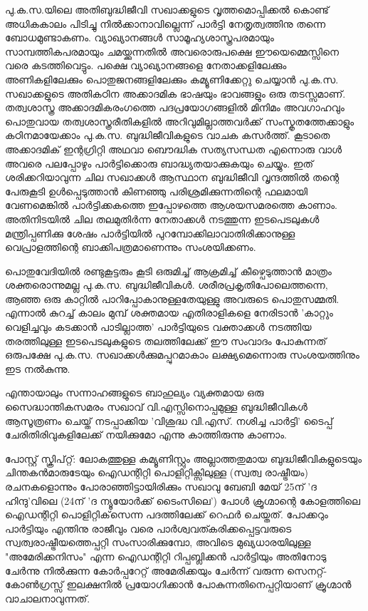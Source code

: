 പു.ക.സ.യിലെ അതിബുദ്ധിജീവി സഖാക്കളുടെ വൃത്തമൊപ്പിക്കല്‍ കൊണ്ട് അധികകാലം പിടിച്ചു നില്‍ക്കാനാവില്ലെന്ന് 
പാര്‍ട്ടി നേതൃത്വത്തിനു തന്നെ ബോധമുണ്ടാകണം. വ്യാഖ്യാനങ്ങള്‍ സാമൂഹ്യശാസ്ത്രപരമായും സാമ്പത്തികപരമായും 
ചമയ്ക്കുന്നതില്‍ അവരൊരുപക്ഷെ ഈയെമ്മെസ്സിനെ വരെ കടത്തിവെട്ടും. പക്ഷെ വ്യാഖ്യാനങ്ങളെ നേതാക്കളിലേക്കും 
അണികളിലേക്കും പൊതുജനങ്ങളിലേക്കും കമ്യൂണിക്കേറ്റു ചെയ്യാന്‍ പു.ക.സ. സഖാക്കളുടെ അതികഠിന അക്കാദമിക ഭാഷയും
ഭാവങ്ങളും ഒരു തടസ്സമാണ്. തത്വശാസ്ത്ര അക്കാദമികരംഗത്തെ പദപ്രയോഗങ്ങളില്‍ മിനിമം അവഗാഹവും പൊതുവായ 
തത്വശാസ്ത്രരീതികളില്‍ അറിവുമില്ലാത്തവര്‍ക്ക് സംസ്കൃതത്തേക്കാളും കഠിനമായേക്കാം പു.ക.സ. ബുദ്ധിജീവികളുടെ വാചക
കസര്‍ത്ത്. കൂടാതെ അക്കാദമിക് ഇന്റഗ്രിറ്റി അഥവാ ബൌദ്ധിക സത്യസന്ധത എന്നൊരു വാള്‍ അവരെ പലപ്പോഴും 
പാര്‍ട്ടിക്കൊരു ബാദ്ധ്യതയാക്കുകയും ചെയ്യും. ഇത് ശരിക്കറിയാവുന്ന ചില സഖാക്കള്‍ ആസ്ഥാന ബുദ്ധിജീവി വൃന്ദത്തില്‍ 
തന്റെ പേരുകൂടി ഉള്‍പ്പെടുത്താന്‍ കിണഞ്ഞു പരിശ്രമിക്കുന്നതിന്റെ ഫലമായി വേണമെങ്കില്‍ പാര്‍ട്ടിക്കകത്തെ ഇപ്പോഴത്തെ
ആശയസമരത്തെ കാണാം. അതിനിടയില്‍ ചില തലമുതിര്‍ന്ന നേതാക്കള്‍ നടത്തുന്ന ഇടപെടലുകള്‍ മന്ത്രിപ്പണിക്കു ശേഷം
പാര്‍ട്ടിയില്‍ പുറമ്പോക്കിലാവാതിരിക്കാനുള്ള വെപ്രാളത്തിന്റെ ബാക്കിപത്രമാണെന്നും സംശയിക്കണം.

പൊതുവേദിയില്‍ രണ്ടുകൂട്ടരും കൂടി ഒരുമിച്ച് ആക്രമിച്ച് കീഴ്പെടുത്താന്‍ മാത്രം ശക്തരൊന്നുമല്ല പു.ക.സ. ബുദ്ധിജീവികള്‍. 
ശരീരപ്രകൃതിപോലെത്തന്നെ, ആഞ്ഞ ഒരു കാറ്റില്‍ പാറിപ്പോകാനുള്ളതേയുള്ളു അവരുടെ പൊതുസമ്മതി. എന്നാല്‍ കുറച്ച്
കാലം മുമ്പ് ശക്തമായ എതിരാളികളെ നേരിടാന്‍ 'കാറ്റും വെളിച്ചവും കടക്കാന്‍ പാടില്ലാത്ത' പാര്‍ട്ടിയുടെ വക്താക്കള്‍ 
നടത്തിയ തരത്തിലുള്ള ഇടപെടലുകളുടെ തലത്തിലേക്ക് ഈ സംവാദം പോകുന്നത് ഒരുപക്ഷേ പു.ക.സ. 
സഖാക്കള്‍ക്കുമപ്പുറമാകാം ലക്ഷ്യമെന്നൊരു സംശയത്തിനും ഇട നല്‍കുന്നു.

എന്തായാലും സന്നാഹങ്ങളുടെ ബാഹുല്യം വ്യക്തമായ ഒരു സൈദ്ധാന്തികസമരം സഖാവ് വി.എസ്സിനൊപ്പമുള്ള 
ബുദ്ധിജീവികള്‍ ആസൂത്രണം ചെയ്ത് നടപ്പാക്കിയ 'വിശുദ്ധ വി.എസ്. നശിച്ച പാര്‍ട്ടി' ടൈപ്പ് ചേരിതിരിവുകളിലേക്ക് 
നയിക്കുമോ എന്നു കാത്തിരുന്നു കാണാം.

പോസ്റ്റ് സ്ക്രിപ്റ്റ്: ലോകത്തുള്ള കമ്യൂണിസ്റ്റും അല്ലാത്തതുമായ ബുദ്ധിജീവികളുടെയും ചിന്തകന്‍മാരുടേയും ഐഡന്റിറ്റി 
പൊളിറ്റിക്സിലുള്ള (സ്വത്വ രാഷ്ട്രീയം) രചനകളൊന്നും പോരാഞ്ഞിട്ടായിരിക്കും സഖാവു ബേബി മേയ് 25ന് 'ദ ഹിന്ദു'വിലെ 
(24ന് 'ദ ന്യൂയോര്‍ക്ക് ടൈംസിലെ') പോള്‍ ക്രൂഗ്മാന്റെ കോളത്തിലെ ഐഡന്റിറ്റി പൊളിറ്റിക്‌സെന്ന പദത്തിലേക്ക് 
റെഫര്‍ ചെയ്തത്. പോക്കറും പാര്‍ട്ടിയും എന്തിനു രാജീവും വരെ പാര്‍ശ്വവത്കരിക്കപ്പെട്ടവരുടെ സ്വത്വരാഷ്ട്രീയത്തെപ്പറ്റി 
സംസാരിക്കുമ്പോ, അവിടെ മുഖ്യധാരയിലുള്ള "അമേരിക്കനിസം" എന്ന ഐഡന്റിറ്റി റിപ്പബ്ലിക്കന്‍ പാര്‍ട്ടിയും അതിനോടു 
ചേര്‍ന്നു നില്‍ക്കുന്ന കോര്‍പ്പറേറ്റ് അമേരിക്കയും ചേര്‍ന്ന് വരുന്ന സെനറ്റ്-കോണ്‍ഗ്രസ്സ് ഇലക്ഷനില്‍ പ്രയോഗിക്കാന്‍ 
പോകുന്നതിനെപ്പറ്റിയാണ് ക്രൂഗ്മാന്‍ വാചാലനാവുന്നത്.

